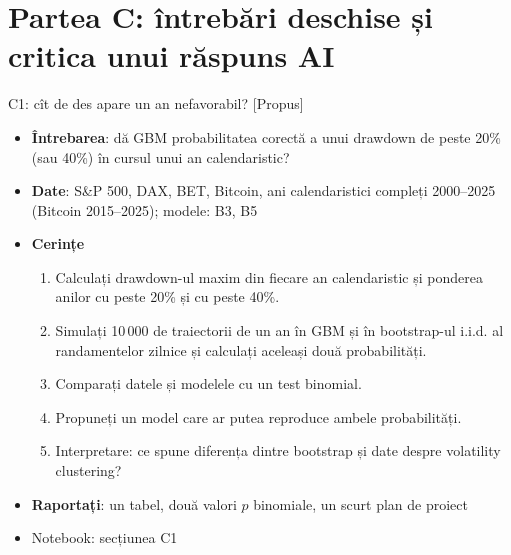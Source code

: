 \section{Partea C: întrebări deschise și critica unui răspuns AI}

\begin{frame}{C1: cît de des apare un an nefavorabil? [Propus]}
\itemsize{\footnotesize}
\begin{itemize}
\item \textbf{Întrebarea}: dă GBM probabilitatea corectă a unui drawdown de peste 20\% (sau 40\%) în cursul unui an calendaristic?
\item \textbf{Date}: S\&P 500, DAX, BET, Bitcoin, ani calendaristici compleți 2000--2025 (Bitcoin 2015--2025); modele: B3, B5
\item \textbf{Cerințe}
\begin{enumerate}
    \item Calculați drawdown-ul maxim din fiecare an calendaristic și ponderea anilor cu peste 20\% și cu peste 40\%.
    \item Simulați 10\,000 de traiectorii de un an în GBM și în bootstrap-ul i.i.d. al randamentelor zilnice și calculați aceleași două probabilități.
    \item Comparați datele și modelele cu un test binomial.
    \item Propuneți un model care ar putea reproduce ambele probabilități.
    \item Interpretare: ce spune diferența dintre bootstrap și date despre volatility clustering?
\end{enumerate}
\item \textbf{Raportați}: un tabel, două valori $p$ binomiale, un scurt plan de proiect
\item Notebook: secțiunea C1
\end{itemize}
\end{frame}

